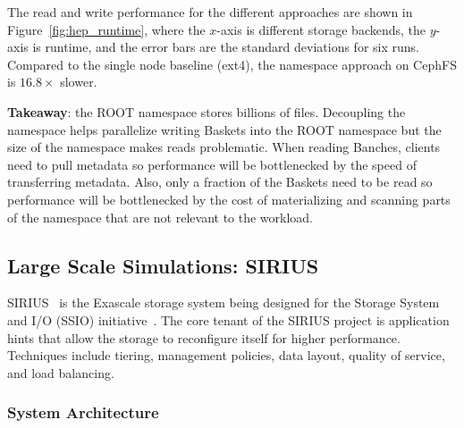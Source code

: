 
The read and write performance for the different approaches are shown in
Figure~\ref{fig:hep_runtime}, where the \(x\)-axis is different storage
backends, the \(y\)-axis is runtime, and the error bars are the standard
deviations for six runs. Compared to the single node baseline (ext4), the
namespace approach on CephFS is \(16.8\times\) slower. 

\textbf{Takeaway}: the ROOT namespace stores billions of files. Decoupling the
namespace helps parallelize writing Baskets into the ROOT namespace but the
size of the namespace makes reads problematic. When reading Banches, clients
need to pull metadata so performance will be bottlenecked by the speed of
transferring metadata. Also, only a fraction of the Baskets need to be read so
performance will be bottlenecked by the cost of materializing and scanning
parts of the namespace that are not relevant to the workload.

\subsection{Large Scale Simulations: SIRIUS}

SIRIUS~\cite{klasky:journal16-sirius} is the Exascale storage system being
designed for the Storage System and I/O (SSIO) initiative~\cite{ross:report14-ssio}. The core tenant of
the SIRIUS project is application hints that allow the storage to reconfigure
itself for higher performance. Techniques include tiering, management policies,
data layout, quality of service, and load balancing. 

\subsubsection{System Architecture}

